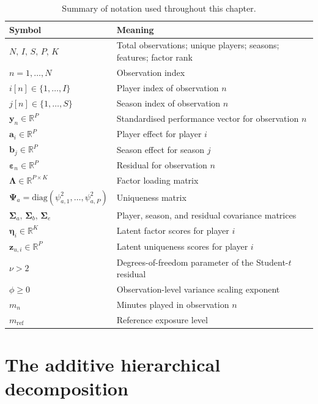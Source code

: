 \begin{table}[tbp]
\centering
\caption{Summary of notation used throughout this chapter.}
\label{tab:notation_model}
\begin{tabularx}{\textwidth}{lX}
\toprule
Symbol & Meaning \\
\midrule
$N,\, I,\, S,\, P,\, K$ & Total observations; unique players; seasons; features; factor rank \\
$n = 1,\ldots,N$ & Observation index \\
$i[n] \in \{1,\ldots,I\}$ & Player index of observation $n$ \\
$j[n] \in \{1,\ldots,S\}$ & Season index of observation $n$ \\
$\mathbf{y}_n \in \mathbb{R}^P$ & Standardised performance vector for observation $n$ \\
$\mathbf{a}_i \in \mathbb{R}^P$ & Player effect for player $i$ \\
$\mathbf{b}_j \in \mathbb{R}^P$ & Season effect for season $j$ \\
$\boldsymbol{\varepsilon}_n \in \mathbb{R}^P$ & Residual for observation $n$ \\
$\boldsymbol{\Lambda} \in \mathbb{R}^{P \times K}$ & Factor loading matrix \\
$\boldsymbol{\Psi}_a = \mathrm{diag}(\psi_{a,1}^2, \ldots, \psi_{a,P}^2)$ & Uniqueness matrix \\
$\boldsymbol{\Sigma}_a,\, \boldsymbol{\Sigma}_b,\, \boldsymbol{\Sigma}_e$ & Player, season, and residual covariance matrices \\
$\boldsymbol{\eta}_i \in \mathbb{R}^K$ & Latent factor scores for player $i$ \\
$\mathbf{z}_{u,i} \in \mathbb{R}^P$ & Latent uniqueness scores for player $i$ \\
$\nu > 2$ & Degrees-of-freedom parameter of the Student-$t$ residual \\
$\phi \geq 0$ & Observation-level variance scaling exponent \\
$m_n$ & Minutes played in observation $n$ \\
$m_{\mathrm{ref}}$ & Reference exposure level \\
\bottomrule
\end{tabularx}
\end{table}

\section{The additive hierarchical decomposition}


